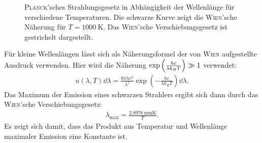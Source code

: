 \documentclass[a4paper,twoside,final]{article}
\begin{document}
\begin{figure}[htp ]
  \centering
  \caption{\textsc{Planck}'sches Strahlungsgesetz in Abhängigkeit der Wellenlänge für verschiedene Temperaturen. Die schwarze Kurve zeigt die \textsc{Wien}'sche Näherung für $T=\SI{1000}{\kelvin}$. Das \textsc{Wien}'sche Verschiebungsgesetz ist gestrichelt dargestellt.}
  \label{fig:Planck}
\end{figure}
Für kleine Wellenlängen lässt sich als Näherungsformel der von \textsc{Wien} aufgestellte Ausdruck verwenden. Hier wird die Näherung $\exp\qty(\frac{hc}{\lambda k_B T}) \gg 1$ verwendet:
\begin{align}
  u(\lambda,T)\dd{\lambda} = \frac{8\pi h c^2}{\lambda^5}\exp(-\frac{hc}{\lambda k_B T})\dd{\lambda}.
\end{align}
Das Maximum der Emission eines schwarzen Strahlers ergibt sich dann durch das \textsc{Wien}'sche Verschiebungsgesetz:
\begin{align}\label{equ:WienscheVerschiebung}
  \lambda_\text{max} = \frac{\SI{2.8978}{\milli\metre\kelvin}}{T}.
\end{align}
Es zeigt sich damit, dass das Produkt aus Temperatur und Wellenlänge maximaler Emission eine Konstante ist.
\end{document}

